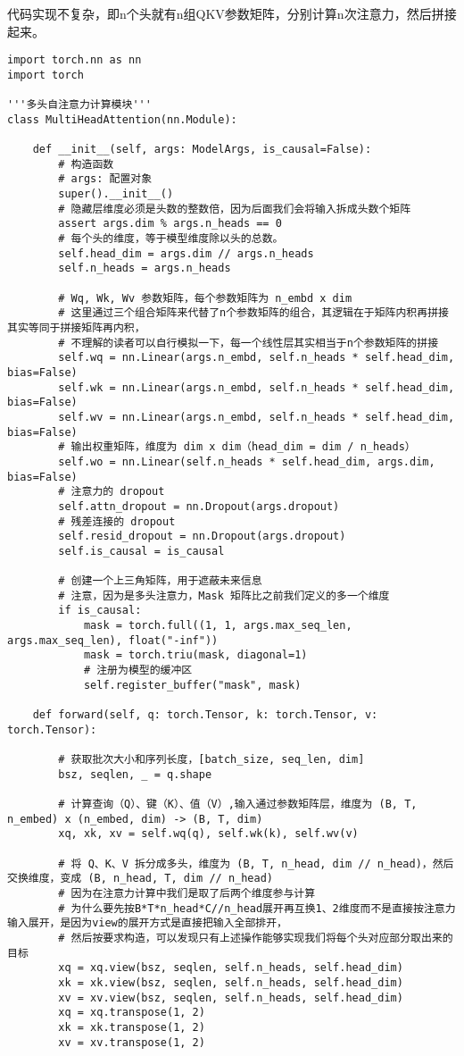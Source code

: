 \documentclass{article}
\begin{document}
代码实现不复杂，即n个头就有n组QKV参数矩阵，分别计算n次注意力，然后拼接起来。
\begin{verbatim}
import torch.nn as nn
import torch

'''多头自注意力计算模块'''
class MultiHeadAttention(nn.Module):

    def __init__(self, args: ModelArgs, is_causal=False):
        # 构造函数
        # args: 配置对象
        super().__init__()
        # 隐藏层维度必须是头数的整数倍，因为后面我们会将输入拆成头数个矩阵
        assert args.dim % args.n_heads == 0
        # 每个头的维度，等于模型维度除以头的总数。
        self.head_dim = args.dim // args.n_heads
        self.n_heads = args.n_heads

        # Wq, Wk, Wv 参数矩阵，每个参数矩阵为 n_embd x dim
        # 这里通过三个组合矩阵来代替了n个参数矩阵的组合，其逻辑在于矩阵内积再拼接其实等同于拼接矩阵再内积，
        # 不理解的读者可以自行模拟一下，每一个线性层其实相当于n个参数矩阵的拼接
        self.wq = nn.Linear(args.n_embd, self.n_heads * self.head_dim, bias=False)
        self.wk = nn.Linear(args.n_embd, self.n_heads * self.head_dim, bias=False)
        self.wv = nn.Linear(args.n_embd, self.n_heads * self.head_dim, bias=False)
        # 输出权重矩阵，维度为 dim x dim（head_dim = dim / n_heads）
        self.wo = nn.Linear(self.n_heads * self.head_dim, args.dim, bias=False)
        # 注意力的 dropout
        self.attn_dropout = nn.Dropout(args.dropout)
        # 残差连接的 dropout
        self.resid_dropout = nn.Dropout(args.dropout)
        self.is_causal = is_causal

        # 创建一个上三角矩阵，用于遮蔽未来信息
        # 注意，因为是多头注意力，Mask 矩阵比之前我们定义的多一个维度
        if is_causal:
            mask = torch.full((1, 1, args.max_seq_len, args.max_seq_len), float("-inf"))
            mask = torch.triu(mask, diagonal=1)
            # 注册为模型的缓冲区
            self.register_buffer("mask", mask)

    def forward(self, q: torch.Tensor, k: torch.Tensor, v: torch.Tensor):

        # 获取批次大小和序列长度，[batch_size, seq_len, dim]
        bsz, seqlen, _ = q.shape

        # 计算查询（Q）、键（K）、值（V）,输入通过参数矩阵层，维度为 (B, T, n_embed) x (n_embed, dim) -> (B, T, dim)
        xq, xk, xv = self.wq(q), self.wk(k), self.wv(v)

        # 将 Q、K、V 拆分成多头，维度为 (B, T, n_head, dim // n_head)，然后交换维度，变成 (B, n_head, T, dim // n_head)
        # 因为在注意力计算中我们是取了后两个维度参与计算
        # 为什么要先按B*T*n_head*C//n_head展开再互换1、2维度而不是直接按注意力输入展开，是因为view的展开方式是直接把输入全部排开，
        # 然后按要求构造，可以发现只有上述操作能够实现我们将每个头对应部分取出来的目标
        xq = xq.view(bsz, seqlen, self.n_heads, self.head_dim)
        xk = xk.view(bsz, seqlen, self.n_heads, self.head_dim)
        xv = xv.view(bsz, seqlen, self.n_heads, self.head_dim)
        xq = xq.transpose(1, 2)
        xk = xk.transpose(1, 2)
        xv = xv.transpose(1, 2)


\end{verbatim}
\end{document}

